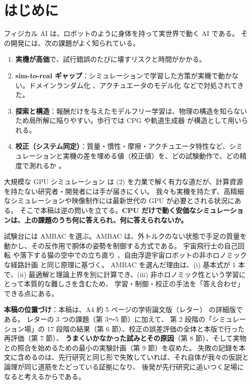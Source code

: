 \documentclass[paper=a4paper,fontsize=10pt,twocolumn,column_gap=2zw,line_length=24zw,number_of_lines=46,head_space=20mm]{jlreq}
\begin{document}
\section{はじめに}

フィジカル AI は、ロボットのように身体を持って実世界で動く AI である。
その開発には、次の課題がよく知られている。
\begin{enumerate}\setlength{\itemsep}{0pt}
\item \textbf{実機が高価}で、試行錯誤のたびに壊すリスクと時間がかかる。
\item \textbf{sim-to-real ギャップ}：シミュレーションで学習した方策が実機で動かない。ドメインランダム化 \cite{tobin2017,peng2018}、アクチュエータのモデル化 \cite{hwangbo2019} などで対処されてきた。
\item \textbf{探索と構造}：報酬だけを与えたモデルフリー学習は、物理の構造を知らないため局所解に陥りやすい。歩行では CPG \cite{ijspeert2008} や軌道生成器 \cite{iscen2018} が構造として用いられる。
\item \textbf{校正（システム同定）}：質量・慣性・摩擦・アクチュエータ特性など、シミュレーションと実機の差を埋める値（校正値）を、どの試験動作で、どの精度で測れるか \cite{atkeson1986,gautier1990}。
\end{enumerate}

大規模な GPU シミュレーション \cite{makoviychuk2021} は (2) を力業で解く有力な道だが、計算資源を持たない研究者・開発者には手が届きにくい。
我々も実機を持たず、高精細なシミュレーションや映像制作には最新世代の GPU が必要とされる状況にある。
そこで本稿は逆の問いを立てる。\textbf{CPU だけで動く安価なシミュレーションは、上の課題のうち何に答えられ、何に答えられないか。}

試験台には AMBAC を選ぶ。AMBAC は、外トルクのない状態で手足の質量を動かし、その反作用で胴体の姿勢を制御する方式である。
宇宙飛行士の自己回転 \cite{kane1970} や落下する猫の空中での立ち直り \cite{kane1969,montgomery1993}、自由浮遊宇宙ロボットの非ホロノミックな経路計画 \cite{nakamura1991} と同じ原理に基づく。
AMBAC を選んだ理由は、(i) 基本式が 1 本で、(ii) 最適解と理論上界を別に計算でき、(iii) 非ホロノミック性という学習にとって本質的な難しさを含むため、
学習・制御・校正の手法を「答え合わせ」できる点にある。

\textbf{本稿の位置づけ}：本稿は、A4 約 5 ページの学術論文版（レター）\cite{letter2026} の詳細版である。
レターの 3 つの課題（第 3〜5 節）に加えて、
第 2 段階の「シミュレーション場」の 17 段階の結果（第 6 節）、校正の誤差評価の全体と本版で行った再評価（第 7 節）、
\textbf{うまくいかなかった試みとその原因}（第 8 節）、そして実物との照合を始めるための最小の実験計画（第 9 節）を収めた。
失敗の記録を本文に含めるのは、先行研究と同じ形で失敗していれば、それ自体が我々の仮説と論理が同じ道筋をたどっている証拠になり、
後発が先行研究に追いつく足場になると考えるからである。
\end{document}
